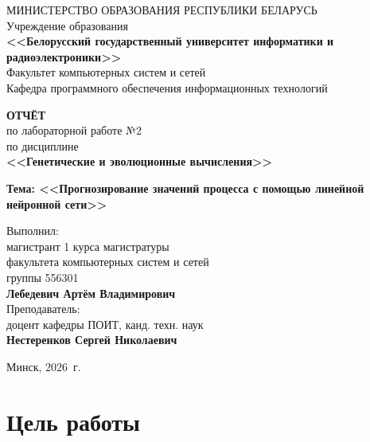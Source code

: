 \documentclass[14pt,a4paper]{extarticle}
\begin{document}
\thispagestyle{empty}

\begin{center}
МИНИСТЕРСТВО ОБРАЗОВАНИЯ РЕСПУБЛИКИ БЕЛАРУСЬ\\[0.5em]
Учреждение образования\\[0.5em]
\textbf{<<Белорусский государственный университет информатики и радиоэлектроники>>}\\[2em]

Факультет компьютерных систем и сетей\\[0.5em]
Кафедра программного обеспечения информационных технологий
\end{center}

\vspace{3em}

\begin{center}
\textbf{ОТЧЁТ}\\[0.5em]
по лабораторной работе №2\\[0.5em]
по дисциплине\\[0.5em]
\textbf{<<Генетические и эволюционные вычисления>>}

\textbf{Тема: <<Прогнозирование значений процесса с помощью линейной нейронной сети>>}
\end{center}

\vspace{4em}

\hfill\begin{minipage}{0.55\textwidth}
Выполнил:\\
магистрант 1 курса магистратуры\\
факультета компьютерных систем и сетей\\
группы 556301\\[0.3em]
\textbf{Лебедевич Артём Владимирович}\\[1.2em]
Преподаватель:\\
доцент кафедры ПОИТ, канд. техн. наук\\
\textbf{Нестеренков Сергей Николаевич}
\end{minipage}

\vfill

\begin{center}
Минск, 2026~г.
\end{center}

\newpage

\tableofcontents

\newpage

\section{Цель работы}
\end{document}
